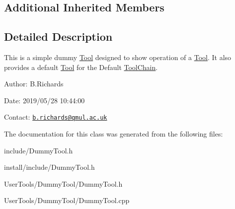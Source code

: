 \subsection*{Additional Inherited Members}


\subsection{Detailed Description}
This is a simple dummy \hyperlink{classTool}{Tool} designed to show operation of a \hyperlink{classTool}{Tool}. It also provides a default \hyperlink{classTool}{Tool} for the Default \hyperlink{classToolChain}{Tool\-Chain}.

\begin{DoxyParagraph}{Author\-:}
B.\-Richards 
\end{DoxyParagraph}
\begin{DoxyParagraph}{Date\-:}
2019/05/28 10\-:44\-:00 
\end{DoxyParagraph}
Contact\-: \href{mailto:b.richards@qmul.ac.uk}{\tt b.\-richards@qmul.\-ac.\-uk} 

The documentation for this class was generated from the following files\-:\begin{DoxyCompactItemize}
\item 
include/Dummy\-Tool.\-h\item 
install/include/Dummy\-Tool.\-h\item 
User\-Tools/\-Dummy\-Tool/Dummy\-Tool.\-h\item 
User\-Tools/\-Dummy\-Tool/Dummy\-Tool.\-cpp\end{DoxyCompactItemize}
